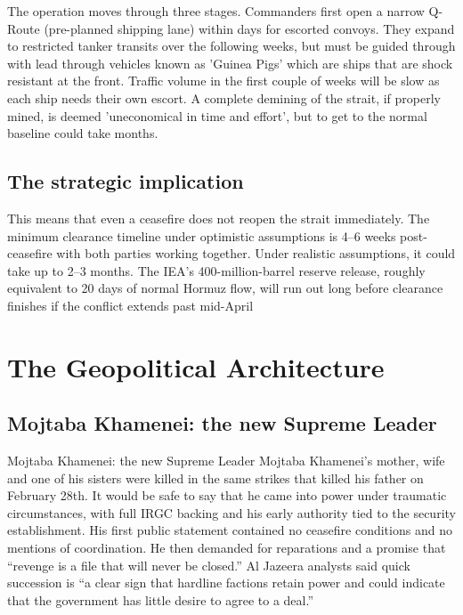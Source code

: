 \documentclass[12pt,a4paper]{article}
\begin{document}
The operation moves through three stages. Commanders first open a narrow Q-Route (pre-planned shipping lane) within days for escorted convoys. They expand to restricted tanker transits over the following weeks, but must be guided through with lead through vehicles known as ’Guinea Pigs’ which are ships that are shock resistant at the front. Traffic volume in the first couple of weeks will be slow as each ship needs their own escort.
A complete demining of the strait, if properly mined, is deemed ’uneconomical in time and effort’, but to get to the normal baseline could take months. 
\subsection{The strategic implication}
This means that even a ceasefire does not reopen the strait immediately. The minimum clearance timeline under optimistic assumptions is 4–6 weeks post-ceasefire with both parties working together. Under realistic assumptions, it could take up to 2–3 months. The IEA’s 400-million-barrel reserve release, roughly equivalent to 20 days of normal Hormuz flow, will run out long before clearance finishes if the conflict extends past mid-April
\section{The Geopolitical Architecture}

\subsection{Mojtaba Khamenei: the new Supreme Leader}

Mojtaba Khamenei: the new Supreme Leader
Mojtaba Khamenei’s mother, wife and one of his sisters were killed in the same strikes that killed his father on February 28th. It would be safe to say that he came into power under traumatic circumstances, with full IRGC backing and his early authority tied to the security establishment. His first public statement contained no ceasefire conditions and no mentions of coordination. He then demanded for reparations and a promise that “revenge is a file that will never be closed.” Al Jazeera analysts said quick succession is “a clear sign that hardline factions retain power and could indicate that the government has little desire to agree to a deal.”
\end{document}
